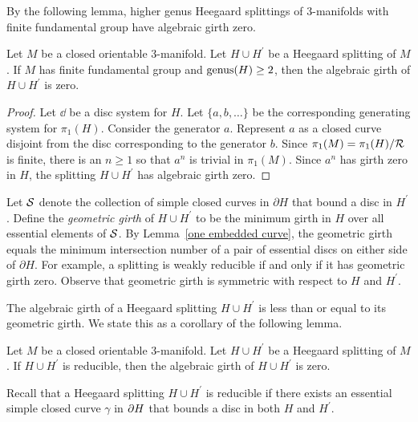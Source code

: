 By the following lemma, higher genus Heegaard splittings of 3-manifolds with finite fundamental group have algebraic girth zero.

\begin{lemma}
\label{finite implies girth zero}
Let $M$ be a closed orientable 3-manifold.  Let $H\cup H^{\prime}$ be a Heegaard splitting of $M$.  If $M$ has finite fundamental group and $\operatorname{genus}(H)\geq 2$, then the algebraic girth of $H\cup H^{\prime}$ is zero.
\end{lemma}

\begin{proof}
Let $\dd$ be a disc system for $H$.  Let $\{ a, b, \ldots \}$ be the corresponding generating system for $\pi_{1}(H)$.  Consider the generator $a$.  Represent $a$ as a closed curve disjoint from the disc corresponding to the generator $b$.  Since $\pi_1(M)=\pi_1(H)/\mathcal{R}$ is finite, there is an $n\geq 1$ so that $a^n$ is trivial in $\pi_1(M)$.  Since $a^n$ has girth zero in $H$, the splitting $H\cup H^\prime$ has algebraic girth zero.
\end{proof}


Let $\mathcal{S}$ denote the collection of simple closed curves in $\partial H$ that bound a disc in $H^\prime$.  Define the \emph{geometric girth} of $H\cup H^\prime$ to be the minimum girth in $H$ over all essential elements of $\mathcal{S}$.  By Lemma~\ref{one embedded curve}, the geometric girth equals the minimum intersection number of a pair of essential discs on either side of $\partial H$.  For example, a splitting is weakly reducible if and only if it has geometric girth zero.  Observe that geometric girth is symmetric with respect to $H$ and $H^{\prime}$.

The algebraic girth of a Heegaard splitting $H\cup H^\prime$ is less than or equal to its geometric girth.  We state this as a corollary of the following lemma.

\begin{lemma}
\label{girth zero}
Let $M$ be a closed orientable $3$-manifold.  Let $H\cup H^\prime$ 
be a Heegaard splitting of $M$.  If $H\cup H^\prime$ is reducible, then the algebraic girth of $H\cup H^\prime$ is zero.
\end{lemma}

Recall that a Heegaard splitting $H\cup H^{\prime}$ is reducible if there exists an essential  simple closed curve $\gamma$ in $\partial H$ that bounds a disc in both $H$ and $H^{\prime}$.


